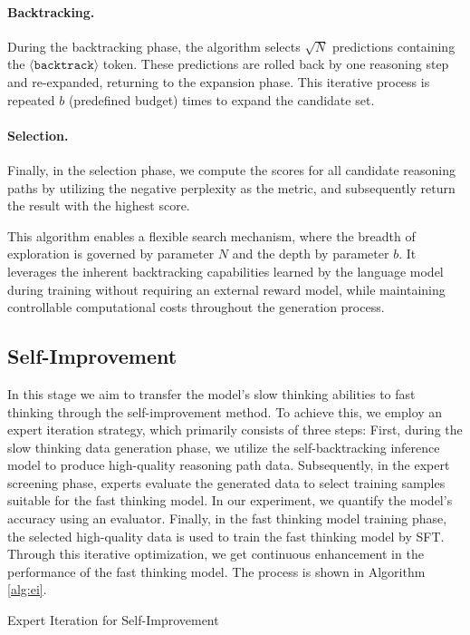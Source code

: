 \documentclass{article}
\theoremstyle{plain}
\theoremstyle{definition}
\theoremstyle{remark}
\begin{document}
\paragraph{Backtracking.}
During the backtracking phase, the algorithm selects \(\sqrt{N}\) predictions containing the \(\langle \texttt{backtrack} \rangle\) token. These predictions are rolled back by one reasoning step and re-expanded, returning to the expansion phase. This iterative process is repeated \( b \) (predefined budget) times to expand the candidate set.

\paragraph{Selection.}
Finally, in the selection phase, we compute the scores for all candidate reasoning paths by utilizing the negative perplexity as the metric, and subsequently return the result with the highest score.

This algorithm enables a flexible search mechanism, where the breadth of exploration is governed by parameter $N$ and the depth by parameter $b$. It leverages the inherent backtracking capabilities learned by the language model during training without requiring an external reward model, while maintaining controllable computational costs throughout the generation process.
\subsection{Self-Improvement}
\label{improvement}
In this stage we aim to transfer the model's slow thinking abilities to fast thinking through the self-improvement method. To achieve this, we employ an expert iteration strategy, which primarily consists of three steps: First, during the slow thinking data generation phase, we utilize the self-backtracking inference model to produce high-quality reasoning path data. Subsequently, in the expert screening phase, experts evaluate the generated data to select training samples suitable for the fast thinking model. In our experiment, we quantify the model's accuracy using an evaluator. Finally, in the fast thinking model training phase, the selected high-quality data is used to train the fast thinking model by SFT. Through this iterative optimization, we get continuous enhancement in the performance of the fast thinking model. The process is shown in Algorithm \ref{alg:ei}.


\begin{algorithm}[t]
\caption{Expert Iteration for Self-Improvement}
\label{alg:ei}
\end{algorithm}
\end{document}
